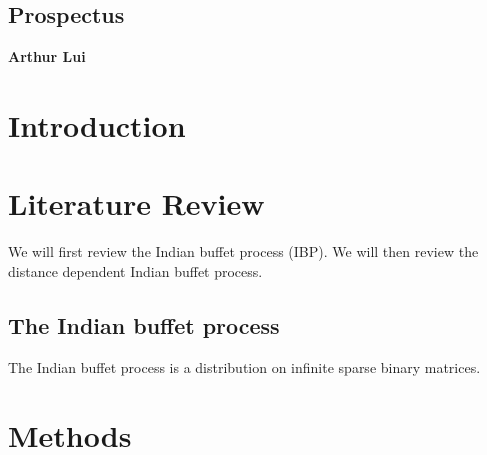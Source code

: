 \documentclass{article}
\begin{document}
\begin{center}
  \section*{Prospectus}
  \textbf{Arthur Lui}
\end{center}

\section{Introduction} %

\section{Literature Review} %
We will first review the Indian buffet process (IBP). We will then review the 
distance dependent Indian buffet process.

\subsection{The Indian buffet process}
The Indian buffet process is a distribution on infinite sparse binary matrices. 




\section{Methods} %
\end{document}
